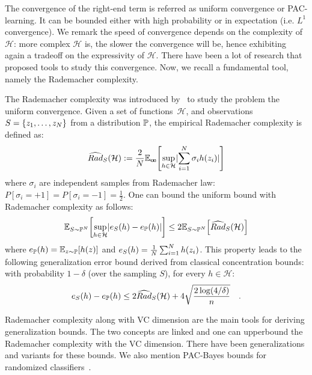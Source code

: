 The convergence of the right-end term is referred as uniform convergence or PAC-learning. It can be bounded either with high probability or in expectation (i.e. $L^1$ convergence). We remark the speed of convergence depends on the complexity of $\mathcal{H}$: more complex $\mathcal{H}$ is, the slower the convergence will be, hence exhibiting again a tradeoff on the expressivity of $\mathcal{H}$. There have been a  lot of research that proposed tools to study this convergence. Now, we recall a fundamental tool, namely the Rademacher complexity.


The Rademacher complexity was introduced by~\cite{bartlett2002rademacher} to study the problem the uniform convergence. Given a set of functions~$\mathcal{H}$, and observations $S=\{z_1,\dots,z_N\}$ from a distribution $\mathbb{P}$, the empirical Rademacher complexity is defined as:
\begin{align*}
    \widehat{Rad}_S(\mathcal{H}):=\frac2\numsamples\mathbb{E}_{\mathbf{\sigma}}\left[\sup_{h\in\mathcal{H}}\lvert\sum_{i=1}^\numsamples\sigma_i h(z_i)\rvert\right]
\end{align*}
where $\sigma_i$ are independent samples from Rademacher law: $P[\sigma_i =+1] = P[\sigma_i =-1]=\frac12$. One can bound the uniform bound with Rademacher complexity as follows:
\begin{align*}
    \mathbb{E}_{S\sim\PP^\numsamples}\left[\sup_{h\in\mathcal{H}}\lvert e_S(h)-e_\PP(h)\rvert\right]\leq 2\mathbb{E}_{S\sim\PP^\numsamples}\left[\widehat{Rad}_S(\mathcal{H})\right]
\end{align*}
where $e_\PP(h)=\mathbb{E}_{z\sim\PP}\left[h(z)\right]$ and $e_S(h)=\frac1{N} \sum_{i=1}^N h(z_i)$. This property leads to the following generalization error bound derived from classical concentration bounds: with probability $1-\delta$ (over the sampling $S$), for every $h\in \mathcal{H}$:
\begin{align*}
    e_S(h)-e_{\mathbb{P}}(h)\leq 2  \widehat{Rad}_S(\mathcal{H})+4\sqrt{\frac{2\log(4/\delta)}{n}}\quad.
\end{align*}


Rademacher complexity along with VC dimension are the main tools for deriving generalization bounds. The two concepts are linked and one can upperbound the Rademacher complexity with the VC dimension.  There have been generalizations and variants for these bounds. We also mention PAC-Bayes bounds for randomized classifiers~\cite{xxx}.



